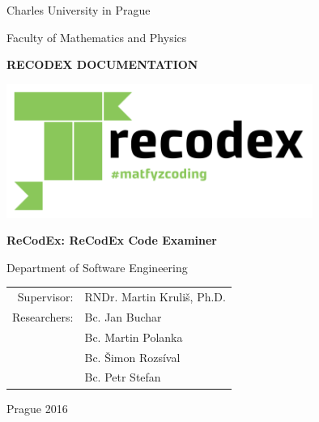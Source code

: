 \pagestyle{empty}
\hypersetup{pageanchor=false}
\begin{center}

\large

Charles University in Prague

\medskip

Faculty of Mathematics and Physics

\vfill

{\bf\Large RECODEX DOCUMENTATION}

\vfill

\centerline{\mbox{\includegraphics[width=100mm]{../logo/logo_recodex.png}}}

\vfill
\vspace{5mm}


\vspace{15mm}

{\LARGE\bfseries ReCodEx: ReCodEx Code Examiner}

\vfill

Department of Software Engineering

\vfill

\begin{tabular}{rl}

Supervisor: & RNDr. Martin Kruliš, Ph.D. \\
\noalign{\vspace{2mm}}
Researchers: & Bc. Jan Buchar \\
			 & Bc. Martin Polanka \\
			 & Bc. Šimon Rozsíval \\
			 & Bc. Petr Stefan \\
\end{tabular}

\vfill

Prague 2016

\end{center}

\newpage

\openright
\pagestyle{plain}
\setcounter{page}{1}
